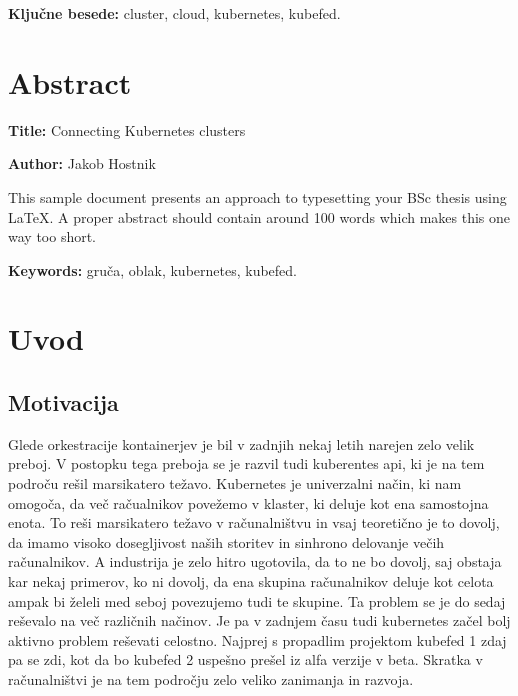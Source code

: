 \documentclass[a4paper, 12pt]{book}
\newcommand{\ttitleEn}{Connecting Kubernetes clusters}
\newcommand{\tauthor}{Jakob Hostnik}
\newcommand{\tkeywords}{cluster, cloud, kubernetes, kubefed}
\newcommand{\tkeywordsEn}{gruča, oblak, kubernetes, kubefed}
\newcommand{\clearemptydoublepage}{\newpage{\pagestyle{empty}\cleardoublepage}}
\begin{document}
\bigskip

\noindent\textbf{Ključne besede:} \tkeywords.
\clearemptydoublepage

\chapter*{Abstract}

\noindent\textbf{Title:} \ttitleEn
\bigskip

\noindent\textbf{Author:} \tauthor
\bigskip

\noindent This sample document presents an approach to typesetting your BSc thesis using \LaTeX. 
A proper abstract should contain around 100 words which makes this one way too short.
\bigskip

\noindent\textbf{Keywords:} \tkeywordsEn.
\clearemptydoublepage

\mainmatter
\setcounter{page}{1}
\pagestyle{fancy}

\chapter{Uvod}
\section{Motivacija}
Glede orkestracije kontainerjev je bil v zadnjih nekaj letih narejen zelo velik preboj. 
V postopku tega preboja se je razvil tudi kuberentes api, ki je na tem področu rešil marsikatero težavo.
Kubernetes  je univerzalni način, ki nam omogoča, da več račualnikov povežemo v klaster, ki deluje kot ena samostojna enota. 
To reši marsikatero težavo v računalništvu in vsaj teoretično je to dovolj, da imamo visoko dosegljivost naših storitev in sinhrono delovanje večih računalnikov.
A industrija je zelo hitro ugotovila, da to ne bo dovolj, saj obstaja kar nekaj primerov, ko ni dovolj, da ena skupina računalnikov deluje kot celota ampak bi želeli med seboj povezujemo tudi te skupine.
Ta problem se je do sedaj reševalo na več različnih načinov.
Je pa v zadnjem času tudi kubernetes začel bolj aktivno problem reševati celostno.
Najprej s propadlim projektom kubefed 1 zdaj pa se zdi, kot da bo kubefed 2 uspešno prešel iz alfa verzije v beta.
Skratka v računalništvi je na tem področju zelo veliko zanimanja in razvoja.
\end{document}
